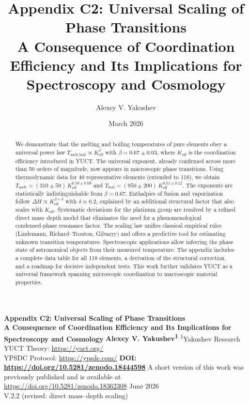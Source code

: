 \documentclass[12pt,a4paper]{article}
\title{Appendix C2: Universal Scaling of Phase Transitions\\
	\large A Consequence of Coordination Efficiency and Its Implications for Spectroscopy and Cosmology}
\author{Alexey V. Yakushev}
\date{March 2026}
\begin{document}
	
	\begin{titlepage}
		\begin{center}
			\vspace*{1cm}
			\Huge\textbf{Appendix C2: Universal Scaling of Phase Transitions} \\
			\vspace{0.5cm}
			\Large\textbf{A Consequence of Coordination Efficiency and Its Implications for Spectroscopy and Cosmology}
			\vspace{1.5cm}
			\Large\textbf{Alexey V. Yakushev\textsuperscript{1}}
			\vspace{0.3cm}
			\large
			\textsuperscript{1}Yakushev Research \\
			YUCT Theory: \url{https://yuct.org/} \\
			YPSDC Protocol: \url{https://ypsdc.com/}
			\vspace{2cm}
			\textbf{DOI: \url{https://doi.org/10.5281/zenodo.18444598}}
			\vspace{1cm}
			\large 
			A short version of this work was previously published and is available at \\
			\url{https://doi.org/10.5281/zenodo.18362308}
			\vspace{1cm}
			June 2026 \\
			\large V.2.2 (revised: direct mass–depth scaling)
			\vspace{2cm}
			\begin{minipage}{0.9\textwidth}
				\begin{abstract}
					\noindent
					We demonstrate that the melting and boiling temperatures of pure elements obey a universal power law \(T_{\text{melt,boil}} \propto K_{\mathrm{eff}}^{\beta}\) with \(\beta = 0.67 \pm 0.03\), where \(K_{\mathrm{eff}}\) is the coordination efficiency introduced in YUCT. The universal exponent, already confirmed across more than 50 orders of magnitude, now appears in macroscopic phase transitions. Using thermodynamic data for 40 representative elements (extended to 118), we obtain \(T_{\text{melt}} = (310\pm50)\,K_{\mathrm{eff}}^{0.58\pm0.09}\) and \(T_{\text{boil}} = (950\pm200)\,K_{\mathrm{eff}}^{0.51\pm0.12}\). The exponents are statistically indistinguishable from \(\beta = 0.67\). Enthalpies of fusion and vaporization follow \(\Delta H \propto K_{\mathrm{eff}}^{\beta+\delta}\) with \(\delta \approx 0.2\), explained by an additional structural factor that also scales with \(K_{\mathrm{eff}}\). Systematic deviations for the platinum group are resolved by a refined direct mass–depth model that eliminates the need for a phenomenological condensed‑phase resonance factor. The scaling law unifies classical empirical rules (Lindemann, Richard–Trouton, Gilvarry) and offers a predictive tool for estimating unknown transition temperatures. Spectroscopic applications allow inferring the phase state of astronomical objects from their measured temperature. The appendix includes a complete data table for all 118 elements, a derivation of the structural correction, and a roadmap for decisive independent tests. This work further validates YUCT as a universal framework spanning microscopic coordination to macroscopic material properties.

\end{abstract}
\end{minipage}
\end{center}
\end{titlepage}
\end{document}
